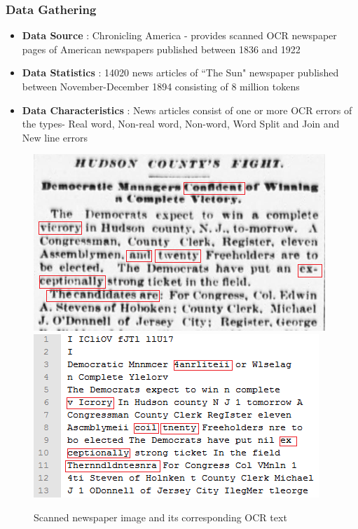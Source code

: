 \documentclass{beamer}
\begin{document}
\begin{frame}

\frametitle{Data Gathering}
\begin{itemize}
\item \textbf{Data Source} : Chronicling America - provides scanned OCR newspaper pages of American newspapers published between 1836 and 1922 
\item \textbf{Data Statistics} : 14020 news articles of ``The Sun" newspaper published between November-December 1894 consisting of 8 million tokens
\item \textbf{Data Characteristics} : News articles consist of one or more OCR errors of the types- Real word, Non-real word, Non-word, Word Split and Join and New line errors
\end{itemize}
\begin{figure}[ht]
\begin{center}
\includegraphics[scale=0.35]{images/originalimage}
\includegraphics[scale=0.35]{images/ocr}
\caption{Scanned newspaper image and its corresponding OCR text}
\end{center}
\end{figure}

\end{frame} 

\end{document}
